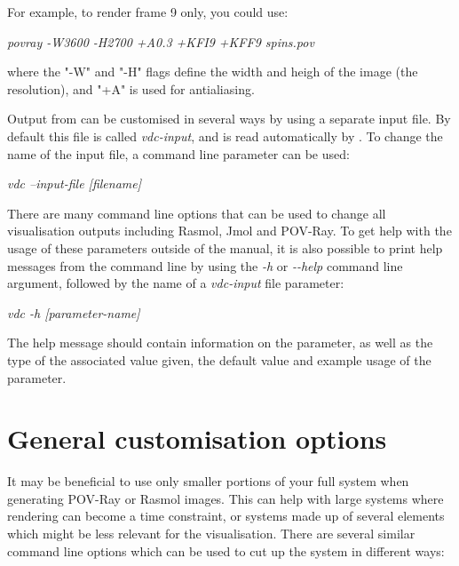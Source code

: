 For example, to render frame 9 only, you could use:

\noindent
\begin{minipage}[c]{\textwidth}
\centering
\textit{povray -W3600 -H2700 +A0.3 +KFI9 +KFF9 spins.pov}
\end{minipage}

\noindent where the "-W" and "-H" flags define the width and heigh of the image (the resolution), and "+A" is used for antialiasing.

Output from \vdc can be customised in several ways by using a separate \vdc input file. By default this file is called \textit{vdc-input}, and is read automatically by \vdc. To change the name of the \vdc input file, a command line parameter can be used:

\noindent
\begin{minipage}[c]{\textwidth}
\centering
\textit{vdc --input-file [filename]}
\end{minipage}

There are many command line options that can be used to change all visualisation outputs including Rasmol, Jmol and POV-Ray. To get help with the usage of these parameters outside of the manual, it is also possible to print help messages from the command line by using the \textit{-h} or \textit{-{}-help} command line argument, followed by the name of a \textit{vdc-input} file parameter:

\noindent
\begin{minipage}[c]{\textwidth}
\centering
\textit{vdc -h [parameter-name]}
\end{minipage}

The help message should contain information on the parameter, as well as the type of the associated value given, the default value and example usage of the parameter.

\section*{General customisation options}

It may be beneficial to use only smaller portions of your full system when generating POV-Ray or Rasmol images. This can help with large systems where rendering can become a time constraint, or systems made up of several elements which might be less relevant for the visualisation. There are several similar command line options which can be used to cut up the system in different ways:

